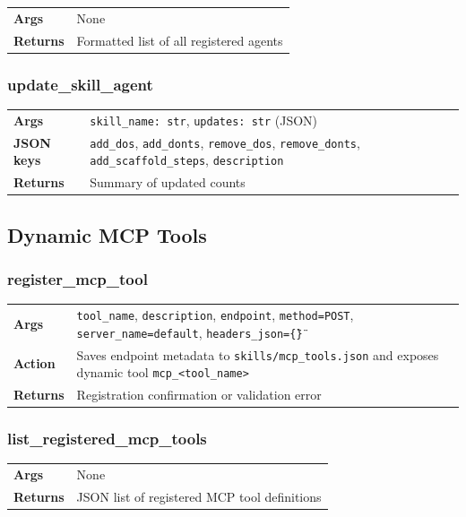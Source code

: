 \documentclass[11pt,a4paper]{article}
\begin{document}
\begin{tabular}{@{}lp{10cm}@{}}
\textbf{Args} & None \\
\textbf{Returns} & Formatted list of all registered agents \\
\end{tabular}

\subsubsection{update\_skill\_agent}

\begin{tabular}{@{}lp{10cm}@{}}
\textbf{Args} & \texttt{skill\_name: str}, \texttt{updates: str} (JSON) \\
\textbf{JSON keys} & \texttt{add\_dos}, \texttt{add\_donts}, \texttt{remove\_dos}, \texttt{remove\_donts}, \texttt{add\_scaffold\_steps}, \texttt{description} \\
\textbf{Returns} & Summary of updated counts \\
\end{tabular}

\subsection{Dynamic MCP Tools}

\subsubsection{register\_mcp\_tool}

\begin{tabular}{@{}lp{10cm}@{}}
\textbf{Args} & \texttt{tool\_name}, \texttt{description}, \texttt{endpoint}, \texttt{method=POST}, \texttt{server\_name=default}, \texttt{headers\_json=\"\{\}\"} \\
\textbf{Action} & Saves endpoint metadata to \texttt{skills/mcp\_tools.json} and exposes dynamic tool \texttt{mcp\_<tool\_name>} \\
\textbf{Returns} & Registration confirmation or validation error \\
\end{tabular}

\subsubsection{list\_registered\_mcp\_tools}

\begin{tabular}{@{}lp{10cm}@{}}
\textbf{Args} & None \\
\textbf{Returns} & JSON list of registered MCP tool definitions \\
\end{tabular}
\end{document}
